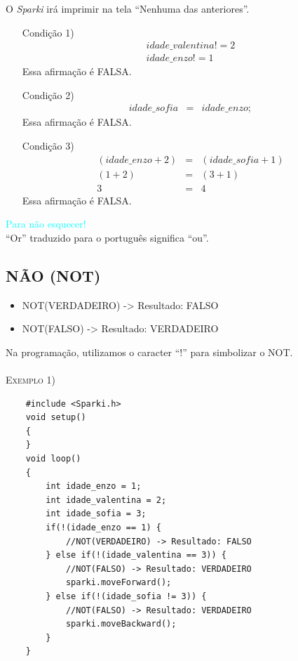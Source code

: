     O \textsl{Sparki} irá imprimir na tela ``Nenhuma das anteriores''.
    \begin{itemize}
        \item[Condição 1)] 
        \begin{eqnarray}
        idade\_valentina != 2\\
        idade\_enzo != 1 \nonumber
        \end{eqnarray}
        Essa afirmação é FALSA.
        \item[Condição 2)]
        \begin{eqnarray}
        idade\_sofia & = & idade\_enzo;
        \end{eqnarray}
        Essa afirmação é FALSA.
        \item[Condição 3)]
        \begin{eqnarray}
        (idade\_enzo + 2) & = & (idade\_sofia + 1)\\
        (1 + 2) & = & (3 + 1) \nonumber \\
        3 & = & 4 \nonumber
        \end{eqnarray}
        Essa afirmação é FALSA.
    \end{itemize}
     
    \begin{center}
        \textcolor{cyan}{Para não esquecer!}
        \\``Or'' traduzido para o português significa ``ou''.
    \end{center}
     
\subsection{NÃO (NOT)}

    \begin{itemize}
        \item NOT(VERDADEIRO) -> Resultado: FALSO
        \item NOT(FALSO) -> Resultado: VERDADEIRO
    \end{itemize}
    
    Na programação, utilizamos o caracter ``!'' para simbolizar o NOT.
    \\
    \\
     \textsc{Exemplo 1)}
     
     \begin{verbatim}
    #include <Sparki.h>
    void setup()
    {
    }
    void loop()
    {
        int idade_enzo = 1;
        int idade_valentina = 2;
        int idade_sofia = 3;
        if(!(idade_enzo == 1) {
            //NOT(VERDADEIRO) -> Resultado: FALSO
        } else if(!(idade_valentina == 3)) {
            //NOT(FALSO) -> Resultado: VERDADEIRO
            sparki.moveForward();
        } else if(!(idade_sofia != 3)) {
            //NOT(FALSO) -> Resultado: VERDADEIRO
            sparki.moveBackward();
        }
    }
    \end{verbatim}
    
